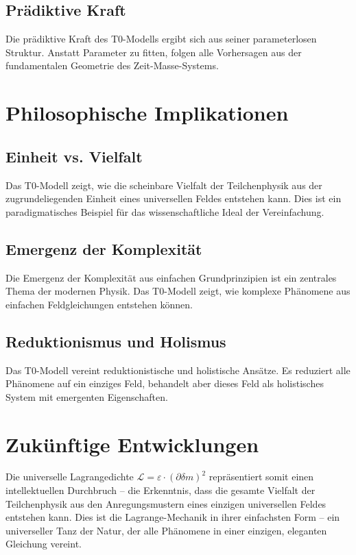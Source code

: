 \documentclass[12pt,a4paper]{report}
\begin{document}
	\subsection{Prädiktive Kraft}
	
	Die prädiktive Kraft des T0-Modells ergibt sich aus seiner parameterlosen Struktur. Anstatt Parameter zu fitten, folgen alle Vorhersagen aus der fundamentalen Geometrie des Zeit-Masse-Systems.
	
	\section{Philosophische Implikationen}
	
	\subsection{Einheit vs. Vielfalt}
	
	Das T0-Modell zeigt, wie die scheinbare Vielfalt der Teilchenphysik aus der zugrundeliegenden Einheit eines universellen Feldes entstehen kann. Dies ist ein paradigmatisches Beispiel für das wissenschaftliche Ideal der Vereinfachung.
	
	\subsection{Emergenz der Komplexität}
	
	Die Emergenz der Komplexität aus einfachen Grundprinzipien ist ein zentrales Thema der modernen Physik. Das T0-Modell zeigt, wie komplexe Phänomene aus einfachen Feldgleichungen entstehen können.
	
	\subsection{Reduktionismus und Holismus}
	
	Das T0-Modell vereint reduktionistische und holistische Ansätze. Es reduziert alle Phänomene auf ein einziges Feld, behandelt aber dieses Feld als holistisches System mit emergenten Eigenschaften.
	
	\section{Zukünftige Entwicklungen}
	
	Die universelle Lagrangedichte $\mathcal{L} = \varepsilon \cdot (\partial\delta m)^2$ repräsentiert somit einen intellektuellen Durchbruch -- die Erkenntnis, dass die gesamte Vielfalt der Teilchenphysik aus den Anregungsmustern eines einzigen universellen Feldes entstehen kann. Dies ist die Lagrange-Mechanik in ihrer einfachsten Form -- ein universeller Tanz der Natur, der alle Phänomene in einer einzigen, eleganten Gleichung vereint.
\end{document}
